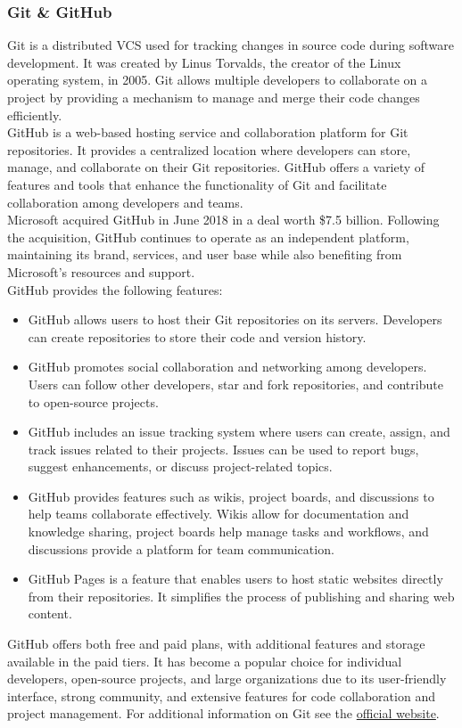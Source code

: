 \subsubsection{Git \& GitHub}
Git is a distributed \ac{VCS} used for tracking changes in source code during software development. It was created by Linus Torvalds, the creator of the Linux operating system, in 2005. Git allows multiple developers to collaborate on a project by providing a mechanism to manage and merge their code changes efficiently.\vspace{5mm} \\
GitHub is a web-based hosting service and collaboration platform for Git repositories. It provides a centralized location where developers can store, manage, and collaborate on their Git repositories. GitHub offers a variety of features and tools that enhance the functionality of Git and facilitate collaboration among developers and teams.\vspace{5mm} \\
Microsoft acquired GitHub in June 2018 in a deal worth \$7.5 billion. Following the acquisition, GitHub continues to operate as an independent platform, maintaining its brand, services, and user base while also benefiting from Microsoft's resources and support.\vspace{5mm} \\
GitHub provides the following features:
\begin{itemize}
  \item GitHub allows users to host their Git repositories on its servers. Developers can create repositories to store their code and version history.
  \item GitHub promotes social collaboration and networking among developers. Users can follow other developers, star and fork repositories, and contribute to open-source projects.
  \item GitHub includes an issue tracking system where users can create, assign, and track issues related to their projects. Issues can be used to report bugs, suggest enhancements, or discuss project-related topics.
  \item GitHub provides features such as wikis, project boards, and discussions to help teams collaborate effectively. Wikis allow for documentation and knowledge sharing, project boards help manage tasks and workflows, and discussions provide a platform for team communication.
  \item GitHub Pages is a feature that enables users to host static websites directly from their repositories. It simplifies the process of publishing and sharing web content.
\end{itemize}
GitHub offers both free and paid plans, with additional features and storage available in the paid tiers. It has become a popular choice for individual developers, open-source projects, and large organizations due to its user-friendly interface, strong community, and extensive features for code collaboration and project management.
For additional information on Git see the \href{https://git-scm.com/}{official website}.

